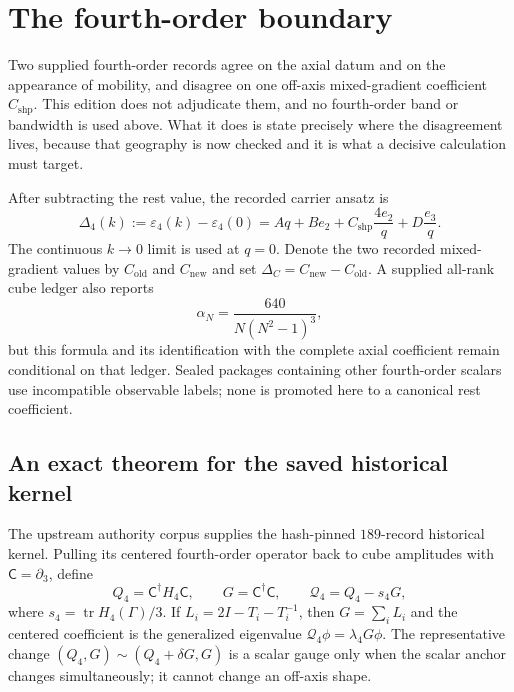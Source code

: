 \documentclass[11pt]{article}
\theoremstyle{plain}
\theoremstyle{definition}
\theoremstyle{remark}
\newcommand{\dg}{^{\dagger}}
\begin{document}
\section{The fourth-order boundary}
\label{sec:fourth}

Two supplied fourth-order records agree on the axial datum and on the
appearance of mobility, and disagree on one off-axis mixed-gradient
coefficient $C_{\mathrm{shp}}$. This edition does not adjudicate them, and no
fourth-order band or bandwidth is used above. What it does is state precisely
where the disagreement lives, because that geography is now checked and it is
what a decisive calculation must target.

After subtracting the rest value, the recorded carrier ansatz is
\begin{equation}\label{eq:shapeansatz}
 \Delta_4(k):=\varepsilon_4(k)-\varepsilon_4(0)
 =Aq+Be_2+C_{\mathrm{shp}}\frac{4e_2}{q}
   +D\frac{e_3}{q}.
\end{equation}
The continuous $k\to0$ limit is used at $q=0$. Denote the two recorded
mixed-gradient values by $C_{\mathrm{old}}$ and $C_{\mathrm{new}}$ and set
$\Delta_C=C_{\mathrm{new}}-C_{\mathrm{old}}$. A supplied all-rank cube ledger
also reports
\begin{equation}\label{eq:alphaN}
 \alpha_N=\frac{640}{N(N^2-1)^3},
\end{equation}
but this formula and its identification with the complete axial coefficient
remain conditional on that ledger. Sealed packages containing other
fourth-order scalars use incompatible observable labels; none is promoted here
to a canonical rest coefficient.

\subsection{An exact theorem for the saved historical kernel}

The upstream authority corpus supplies the hash-pinned $189$-record historical
kernel. Pulling its centered fourth-order operator back to cube amplitudes with
$\mathsf C=\partial_3$, define
\[
 Q_4=\mathsf C\dg H_4\mathsf C,
 \qquad G=\mathsf C\dg\mathsf C,
 \qquad \mathcal Q_4=Q_4-s_4G,
\]
where $s_4=\operatorname{tr}H_4(\Gamma)/3$. If
$L_i=2I-T_i-T_i^{-1}$, then $G=\sum_iL_i$ and the centered coefficient is the
generalized eigenvalue $\mathcal Q_4\phi=\lambda_4G\phi$. The representative
change $(Q_4,G)\sim(Q_4+\delta G,G)$ is a scalar gauge only when the scalar
anchor changes simultaneously; it cannot change an off-axis shape.
\end{document}
